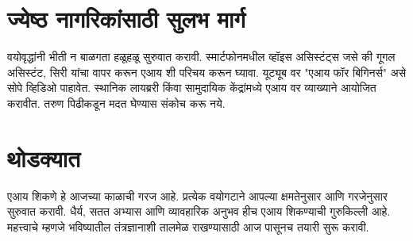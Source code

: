 \section*{ज्येष्ठ नागरिकांसाठी सुलभ मार्ग}
वयोवृद्धांनी भीती न बाळगता हळूहळू सुरुवात करावी. स्मार्टफोनमधील व्हॉइस असिस्टंट्स जसे की गूगल असिस्टंट, सिरी यांचा वापर करून एआय शी परिचय करून घ्यावा.
यूट्यूब वर "एआय फॉर बिगिनर्स" असे सोपे व्हिडिओ पाहावेत. स्थानिक लायब्ररी किंवा सामुदायिक केंद्रांमध्ये एआय वर व्याख्याने आयोजित करावीत. तरुण पिढीकडून मदत घेण्यास संकोच करू नये.

\section*{थोडक्यात}
एआय शिकणे हे आजच्या काळाची गरज आहे. प्रत्येक वयोगटाने आपल्या क्षमतेनुसार आणि गरजेनुसार सुरुवात करावी. धैर्य, सतत अभ्यास आणि व्यावहारिक अनुभव हीच एआय शिकण्याची गुरुकिल्ली आहे. महत्त्वाचे म्हणजे भविष्यातील तंत्रज्ञानाशी तालमेळ राखण्यासाठी आज पासूनच तयारी सुरू करावी.